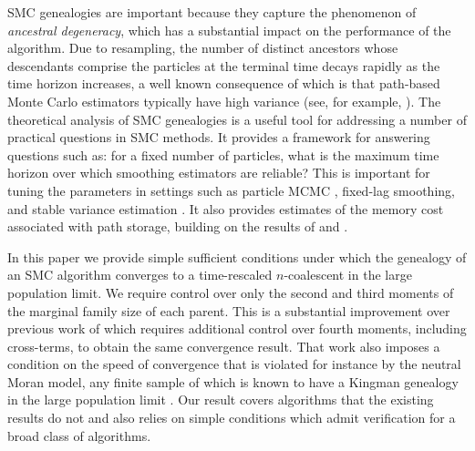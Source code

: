 \documentclass{article}
\theoremstyle{definition}
\newcommand{\1}[1]{\mathbbm{1}_{\{#1\}}}
\begin{document}
SMC genealogies are important because they capture the phenomenon of \emph{ancestral degeneracy}, which has a substantial impact on the performance of the algorithm.  Due to resampling, the number of distinct ancestors whose descendants comprise the particles at the terminal time decays rapidly as the time horizon increases, a well known consequence of which is that path-based Monte Carlo estimators typically have high variance (see, for example, \citet{briers10,fearnhead18}).
The theoretical analysis of SMC genealogies is a useful tool for addressing a number of practical questions in SMC methods. It provides a framework for answering questions such as: for a fixed number of particles, what is the maximum time horizon over which smoothing estimators are reliable? This is important for tuning the parameters in settings such as particle MCMC \citep{andrieu2010}, fixed-lag smoothing, and stable variance estimation \citep{olsson2019}. It also provides estimates of the memory cost associated with path storage, building on the results of \citet{jacob2015} and \citet[Corollary 2]{koskela2018}.

In this paper we provide simple sufficient conditions under which the genealogy of an SMC algorithm converges to a time-rescaled $n$-coalescent \citep{kingman1982coal} in the large population limit. We require control over only the second and third moments of the marginal family size of each parent. 
This is a substantial improvement over previous work of \citet{koskela2018} which requires additional control over fourth moments, including cross-terms, to obtain the same convergence result. That work also imposes a condition on the speed of convergence that is violated for instance by the neutral Moran model, any finite sample of which is known to have a Kingman genealogy in the large population limit \citep[see][p47]{durrett2008}. Our result covers algorithms that the existing results do not and also relies on simple conditions which admit verification for a broad class of algorithms.
\end{document}
